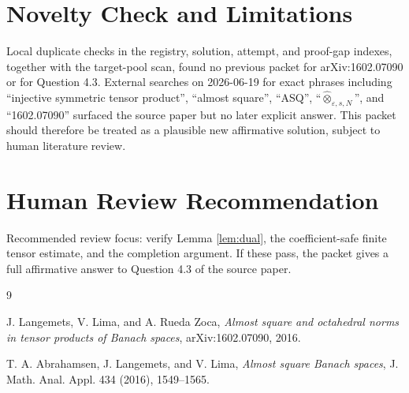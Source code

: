 \documentclass[11pt]{article}
\begin{document}
\section*{Novelty Check and Limitations}

Local duplicate checks in the registry, solution, attempt, and proof-gap
indexes, together with the target-pool scan, found no previous packet for
arXiv:1602.07090 or for Question 4.3.
External searches on 2026-06-19 for exact phrases including
``injective symmetric tensor product'', ``almost square'', ``ASQ'',
``\(\widehat{\otimes}_{\varepsilon,s,N}\)'', and ``1602.07090'' surfaced
the source paper but no later explicit answer. This packet should therefore
be treated as a plausible new affirmative solution, subject to human
literature review.

\section*{Human Review Recommendation}

Recommended review focus: verify Lemma \ref{lem:dual}, the coefficient-safe
finite tensor estimate, and the completion argument. If these pass, the
packet gives a full affirmative answer to Question 4.3 of the source paper.

\begin{thebibliography}{9}

J. Langemets, V. Lima, and A. Rueda Zoca,
\emph{Almost square and octahedral norms in tensor products of Banach spaces},
arXiv:1602.07090, 2016.

T. A. Abrahamsen, J. Langemets, and V. Lima,
\emph{Almost square Banach spaces},
J. Math. Anal. Appl. 434 (2016), 1549--1565.

\end{thebibliography}
\end{document}
